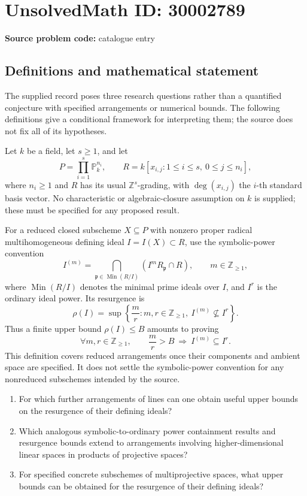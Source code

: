\documentclass[11pt]{article}
\newcommand{\Z}{\mathbb{Z}}
\newcommand{\PP}{\mathbb{P}}
\begin{document}
\section*{UnsolvedMath ID: 30002789}
\textbf{Source problem code:} catalogue entry
\subsection{Definitions and mathematical statement}
The supplied record poses three research questions rather than a quantified conjecture with specified arrangements or numerical bounds. The following definitions give a conditional framework for interpreting them; the source does not fix all of its hypotheses.

Let \(k\) be a field, let \(s\geq 1\), and let
\[
P=\prod_{i=1}^{s}\PP_k^{n_i},\qquad
R=k[x_{i,j}:1\leq i\leq s,\ 0\leq j\leq n_i],
\]
where \(n_i\geq 1\) and \(R\) has its usual \(\Z^s\)-grading, with \(\deg(x_{i,j})\) the \(i\)-th standard basis vector. No characteristic or algebraic-closure assumption on \(k\) is supplied; these must be specified for any proposed result.

For a reduced closed subscheme \(X\subseteq P\) with nonzero proper radical multihomogeneous defining ideal \(I=I(X)\subset R\), use the symbolic-power convention
\[
I^{(m)}=\bigcap_{\mathfrak p\in\operatorname{Min}(R/I)}
\left(I^mR_{\mathfrak p}\cap R\right),\qquad m\in\Z_{\geq 1},
\]
where \(\operatorname{Min}(R/I)\) denotes the minimal prime ideals over \(I\), and \(I^r\) is the ordinary ideal power. Its resurgence is
\[
\rho(I)=\sup\left\{\frac{m}{r}:m,r\in\Z_{\geq 1},\ I^{(m)}\not\subseteq I^r\right\}.
\]
Thus a finite upper bound \(\rho(I)\leq B\) amounts to proving
\[
\forall m,r\in\Z_{\geq 1},\qquad
\frac{m}{r}>B\ \Longrightarrow\ I^{(m)}\subseteq I^r.
\]
This definition covers reduced arrangements once their components and ambient space are specified. It does not settle the symbolic-power convention for any nonreduced subschemes intended by the source.

\begin{enumerate}
\item For which further arrangements of lines can one obtain useful upper bounds on the resurgence of their defining ideals?
\item Which analogous symbolic-to-ordinary power containment results and resurgence bounds extend to arrangements involving higher-dimensional linear spaces in products of projective spaces?
\item For specified concrete subschemes of multiprojective spaces, what upper bounds can be obtained for the resurgence of their defining ideals?
\end{enumerate}
\end{document}
